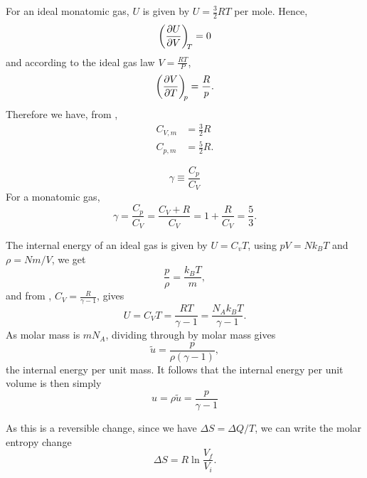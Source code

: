 \begin{coro}
For an ideal monatomic gas, $U$ is given by $U=\frac{3}{2}RT$ per mole. Hence, 
\begin{equation}
\diffp UV[T]=0
\end{equation}
and according to the ideal gas law $V=\frac{RT}{P}$,
\begin{equation}
\diffp VT[p]=\frac{R}{p}.
\end{equation}
Therefore we have, from ,
\begin{subequations}
\begin{align}
C_{V, m}&=\frac{3}{2}R \\
C_{p, m}&=\frac{5}{2}R.
\end{align}
\end{subequations}
\end{coro}

\begin{defi}
\label{defi:ad_ind}
\begin{equation}
\gamma \equiv \frac{C_p}{C_V}
\end{equation}
For a monatomic gas, 
\begin{equation}
\label{monat_ad}
\gamma = \frac{C_p}{C_V} = \frac{C_V+R}{C_V}=1+\frac{R}{C_V}=\frac{5}{3}.
\end{equation}
\end{defi}

\begin{coro}
The internal energy of an ideal gas is given by $U=C_vT$, 
using $pV=Nk_BT$ and $\rho=Nm/V$, we get
\begin{equation}
\frac{p}{\rho}=\frac{k_BT}{m},
\end{equation} 
and from , $C_V=\frac{R}{\gamma - 1}$, gives 
\begin{equation}
U=C_VT=\frac{RT}{\gamma - 1}=\frac{N_Ak_BT}{\gamma-1}.
\end{equation}
As molar mass is $mN_A$, dividing through by molar mass gives
\begin{equation}
\tilde{u}=\frac{p}{\rho\left(\gamma-1\right)},
\end{equation}
the internal energy per unit mass. 
It follows that the internal energy per unit volume is then simply
\begin{equation}
u=\rho\tilde{u}=\frac{p}{\gamma-1}
\end{equation}
\end{coro} 
As this is a reversible change, since we have $\Delta S=\Delta Q/T$, we can write the molar entropy change
\begin{equation}
	\Delta S=R\ln\frac{V_f}{V_i}.
\end{equation}


